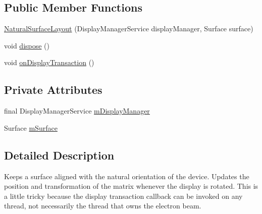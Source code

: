 \subsection*{Public Member Functions}
\begin{DoxyCompactItemize}
\item 
\hyperlink{classcom_1_1android_1_1server_1_1power_1_1ElectronBeam_1_1NaturalSurfaceLayout_a36c9443f02e9afb0e21ac248aec3c04d}{Natural\-Surface\-Layout} (Display\-Manager\-Service display\-Manager, Surface surface)
\item 
void \hyperlink{classcom_1_1android_1_1server_1_1power_1_1ElectronBeam_1_1NaturalSurfaceLayout_a42e7b039790c30ea68acdb8df6bd95a5}{dispose} ()
\item 
void \hyperlink{classcom_1_1android_1_1server_1_1power_1_1ElectronBeam_1_1NaturalSurfaceLayout_a4de66347d52f912fb7878aac9f0c0887}{on\-Display\-Transaction} ()
\end{DoxyCompactItemize}
\subsection*{Private Attributes}
\begin{DoxyCompactItemize}
\item 
final Display\-Manager\-Service \hyperlink{classcom_1_1android_1_1server_1_1power_1_1ElectronBeam_1_1NaturalSurfaceLayout_a5b437ab809caf97d241478ce52c6c932}{m\-Display\-Manager}
\item 
Surface \hyperlink{classcom_1_1android_1_1server_1_1power_1_1ElectronBeam_1_1NaturalSurfaceLayout_abb69c08305d023474da59b30206b8fd8}{m\-Surface}
\end{DoxyCompactItemize}


\subsection{Detailed Description}
Keeps a surface aligned with the natural orientation of the device. Updates the position and transformation of the matrix whenever the display is rotated. This is a little tricky because the display transaction callback can be invoked on any thread, not necessarily the thread that owns the electron beam. 

